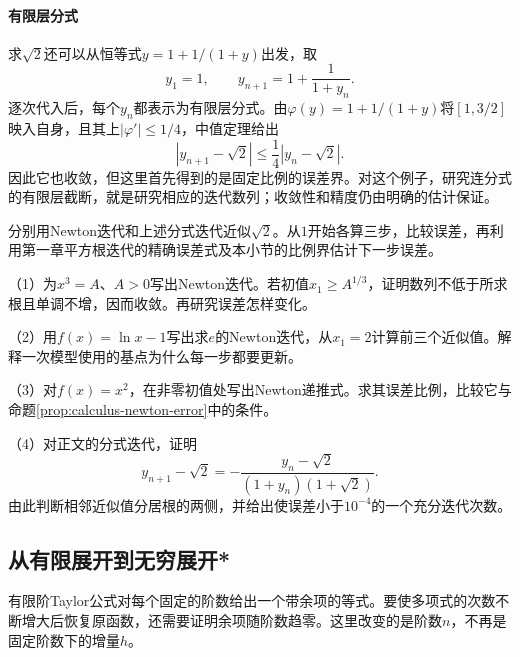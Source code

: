 \newpage
\paragraph{有限层分式} \mbox{}

求\(\sqrt2\)还可以从恒等式\(y=1+1/(1+y)\)出发，取
\begin{equation*}
 y_1=1,\qquad y_{n+1}=1+\frac1{1+y_n}.
\end{equation*}
逐次代入后，每个\(y_n\)都表示为有限层分式。由\(\varphi(y)=1+1/(1+y)\)将\([1,3/2]\)映入自身，且其上\(|\varphi'|\le1/4\)，中值定理给出
\begin{equation*}
 |y_{n+1}-\sqrt2|\le\frac14|y_n-\sqrt2|.
\end{equation*}
因此它也收敛，但这里首先得到的是固定比例的误差界。对这个例子，研究连分式的有限层截断，就是研究相应的迭代数列；收敛性和精度仍由明确的估计保证。

\begin{example}
分别用Newton迭代和上述分式迭代近似\(\sqrt2\)。从\(1\)开始各算三步，比较误差，再利用第一章平方根迭代的精确误差式及本小节的比例界估计下一步误差。
\end{example}

\begin{exercise}
\mbox{}\par\nobreak

（1）为\(x^3=A\)、\(A>0\)写出Newton迭代。若初值\(x_1\ge A^{1/3}\)，证明数列不低于所求根且单调不增，因而收敛。再研究误差怎样变化。

（2）用\(f(x)=\ln x-1\)写出求\(e\)的Newton迭代，从\(x_1=2\)计算前三个近似值。解释一次模型使用的基点为什么每一步都要更新。

（3）对\(f(x)=x^2\)，在非零初值处写出Newton递推式。求其误差比例，比较它与命题\ref{prop:calculus-newton-error}中的条件。

（4）对正文的分式迭代，证明
\begin{equation*}
 y_{n+1}-\sqrt2=-\frac{y_n-\sqrt2}{(1+y_n)(1+\sqrt2)}.
\end{equation*}
由此判断相邻近似值分居根的两侧，并给出使误差小于\(10^{-4}\)的一个充分迭代次数。
\end{exercise}

\subsection{从有限展开到无穷展开*}

有限阶Taylor公式对每个固定的阶数给出一个带余项的等式。要使多项式的次数不断增大后恢复原函数，还需要证明余项随阶数趋零。这里改变的是阶数\(n\)，不再是固定阶数下的增量\(h\)。

